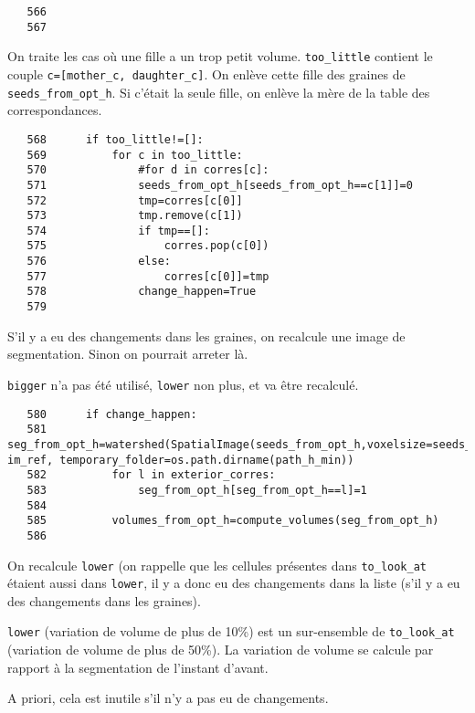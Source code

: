 \documentclass{article}
\def \mycolor {red}
\begin{document}
\color{black}
\begin{verbatim}
   566	
   567	
\end{verbatim} 
\color{\mycolor}
On traite les cas o\`u une fille a un trop petit volume. 
\verb|too_little| contient le couple \verb|c=[mother_c, daughter_c]|.
On enl\`eve cette fille des graines de \verb|seeds_from_opt_h|. Si c'\'etait la seule fille, on enl\`eve la m\`ere de la table des correspondances.
\color{black}
\begin{verbatim}
   568	    if too_little!=[]:
   569	        for c in too_little:
   570	            #for d in corres[c]:
   571	            seeds_from_opt_h[seeds_from_opt_h==c[1]]=0
   572	            tmp=corres[c[0]]
   573	            tmp.remove(c[1])
   574	            if tmp==[]:
   575	                corres.pop(c[0])
   576	            else:
   577	                corres[c[0]]=tmp
   578	            change_happen=True
   579	
\end{verbatim} 
\color{\mycolor}
S'il y a eu des changements dans les graines, on recalcule une image de segmentation. Sinon on pourrait arreter l\`a.

\verb|bigger| n'a pas \'et\'e utilis\'e, \verb|lower| non plus, et va \^etre recalcul\'e.
\color{black}
\begin{verbatim}
   580	    if change_happen:
   581	        seg_from_opt_h=watershed(SpatialImage(seeds_from_opt_h,voxelsize=seeds_from_opt_h.voxelsize), im_ref, temporary_folder=os.path.dirname(path_h_min))
   582	        for l in exterior_corres:
   583	            seg_from_opt_h[seg_from_opt_h==l]=1  
   584	            
   585	        volumes_from_opt_h=compute_volumes(seg_from_opt_h)
   586	
\end{verbatim} 
\color{\mycolor}
On recalcule \verb|lower| (on rappelle que les cellules pr\'esentes dans \verb|to_look_at| \'etaient aussi dans \verb|lower|, il y a donc eu des changements dans la liste (s'il y a eu des changements dans les graines).

\verb|lower| (variation de volume de plus de 10\%) est un sur-ensemble de \verb|to_look_at| (variation de volume de plus de 50\%). La variation de volume se calcule par rapport \`a la segmentation de l'instant d'avant.

A priori, cela est inutile s'il n'y a pas eu de changements.
\end{document}
